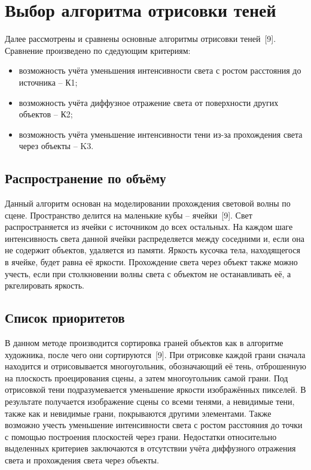 \section{Выбор алгоритма отрисовки теней} {
    Далее рассмотрены и сравнены основные алгоритмы отрисовки теней~[9].
    Сравнение произведено по сдедующим критериям:
    \begin{itemize}
        \item возможность учёта уменьшения интенсивности света с ростом
        расстояния до источника -- К1;
        \item возможность учёта диффузное отражение света
        от поверхности других объектов -- К2;
        \item возможность учёта уменьшение интенсивности тени из-за
        прохождения света через объекты -- K3.
    \end{itemize}
    
    \subsection{Распространение по объёму} {
        Данный алгоритм основан на моделировании прохождения световой волны по сцене.
        Пространство делится на маленькие кубы -- ячейки~[9].
        Свет распространяется из ячейки с источником до всех остальных.
        На каждом шаге интенсивность света данной ячейки распределяется между
        соседними и, если она не содержит объектов, удаляется из памяти.
        Яркость кусочка тела, находящегося в ячейке, будет равна её яркости.
        Прохождение света через объект также можно учесть, если при столкновении волны света с объектом не останавливать её, а ркгелировать яркость.
    }
    \subsection{Список приоритетов} {
        В данном методе производится сортировка граней объектов
        как в алгоритме художника, после чего они сортируются~[9].
        При отрисовке каждой грани сначала находится и отрисовывается
        многоугольник, обозначающий её тень, отброшенную на плоскость
        проецирования сцены, а затем многоугольник самой грани.
        Под отрисовкой тени подразумевается уменьшение яркости изображённых пикселей.
        В результате получается изображение сцены со всеми тенями, а невидимые тени,
        также как и невидимые грани, покрываются другими элементами.
        Также возможно учесть уменьшение интенсивности света с ростом
        расстояния до точки с помощью построения плоскостей через грани.
        Недостатки относительно выделенных критериев заключаются в отсутствии учёта
        диффузного отражения света и прохождения света через объекты.
    }
}

